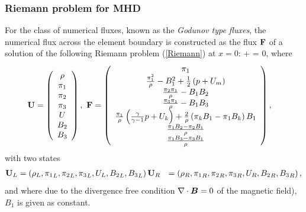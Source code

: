 \subsubsection{Riemann problem for MHD}
For the class of numerical fluxes, known as the \textit{Godunov type fluxes}, the numerical flux across the element boundary is constructed as the flux $\mathrm{\mathbf{F}}$ of a solution of the following Riemann problem (\cref{Riemann}) at $x = 0$:
\be
\label{Riemann}
 +  = 0,
\ee
where
\begin{align}
\label{RiemannUDef}
\mathrm{\mathbf{U}} & =  \left(\begin{array}{c}\rho \\ \pi_1 \\ \pi_2 \\ \pi_3 \\ U \\ B_2 \\ B_3 \\ \end{array}\right),\ \mathrm{\mathbf{F}} = \left(\begin{array}{c} \pi_1 \\ \frac{\pi_1^2}{\rho} - B_1^2 + \frac12\left( p + U_m\right) \\ \frac{\pi_2 \pi_1}{\rho} - B_1 B_2 \\ \frac{\pi_3 \pi_1}{\rho} - B_1 B_3\\ \frac{\pi_1}{\rho} \left( \frac{\gamma}{\gamma - 1} p + U_k\right) + \frac{2}{\rho} \left( \pi_k B_1 - \pi_1 B_k\right) B_1  \\ \frac{\pi_1 B_2 - \pi_2 B_1}{\rho} \\ \frac{\pi_1 B_3 - \pi_3 B_1}{\rho} \\ \end{array}\right),
\end{align}
with two states
\begin{align}
\mathrm{\mathbf{U}}_L & =  \left(\rho_L, {\pi_1}_L, {\pi_2}_L, {\pi_3}_L, {U}_L, {B_2}_L, {B_3}_L \right)
\mathrm{\mathbf{U}}_R & =  \left(\rho_R, {\pi_1}_R, {\pi_2}_R, {\pi_3}_R, {U}_R, {B_2}_R, {B_3}_R \right),
\end{align}
and where due to the divergence free condition $\nabla\cdot \mbox{\boldmath $B$} = 0$ of the magnetic field), $B_1$ is given as constant.
